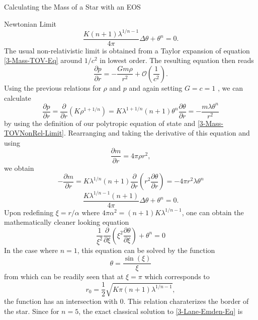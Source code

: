 \begin{section}{Calculating the Mass of a Star with an EOS}
\begin{subsection}{Newtonian Limit}
\begin{equation}
	\frac{K(n+1)\lambda^{1/n-1}}{4\pi}\Delta\theta+\theta^n=0.
\end{equation}
The usual non-relativistic limit is obtained from a Taylor expansion of equation \ref{3-Mass-TOV-Eq} around $1/c^2$ in lowest order. The resulting equation then reads
\begin{equation}
	\frac{\partial p}{\partial r} = -\frac{Gm\rho}{r^2} + \mathcal{O}\left(\frac{1}{c^2}\right).
	\label{3-Mass-TOVNonRel-Limit}
\end{equation}
Using the previous relations for $\rho$ and $p$ and again setting $G=c=1$ , we can calculate
\begin{equation}
	\frac{\partial p}{\partial r} = \frac{\partial}{\partial r}\left(K\rho^{1+1/n}\right)= K\lambda^{1+1/n}(n+1)\theta^n\frac{\partial\theta}{\partial r} = -\frac{m\lambda\theta^n}{r^2}
\end{equation}
by using the definition of our polytropic equation of state and \ref{3-Mass-TOVNonRel-Limit}. Rearranging and taking the derivative of this equation and using
\begin{equation}
	\frac{\partial m}{\partial r} = 4\pi\rho r^2,
\end{equation}
we obtain
\begin{equation}
	- \frac{\partial m}{\partial r} = K\lambda^{1/n}(n+1)\frac{\partial}{\partial r}\left(r^2\frac{\partial\theta}{\partial r}\right) = -4\pi r^2\lambda\theta^n
\end{equation}
\begin{equation}
	\frac{K\lambda^{1/n-1}(n+1)}{4\pi}\Delta\theta+\theta^n=0.
\end{equation}
Upon redefining $\xi=r/\alpha$ where $4\pi\alpha^2=(n+1)K\lambda^{1/n-1}$, one can obtain the mathematically cleaner looking equation
\begin{equation}
	\frac{1}{\xi^2}\frac{\partial}{\partial\xi}\left(\xi^2\frac{\partial\theta}{\partial\xi}\right) + \theta^n=0 \label{3-Lane-Emden-Eq}
\end{equation}
In the case where $n=1$, this equation can be solved by the function
\begin{equation}
	\theta=\frac{\sin(\xi)}{\xi}
\end{equation}
from which can be readily seen that at $\xi=\pi$ which corresponds to 
\begin{equation}
	r_0=\frac{1}{2}\sqrt{K\pi(n+1)\lambda^{1/n-1}},
\end{equation}
the function has an intersection with $0$. This relation charaterizes the border of the star. Since for $n=5$, the exact classical solution to \ref{3-Lane-Emden-Eq} is \cite{chandrasekharChandrasekharAnIntroductionStudy1958}

\end{subsection}
\end{section}
